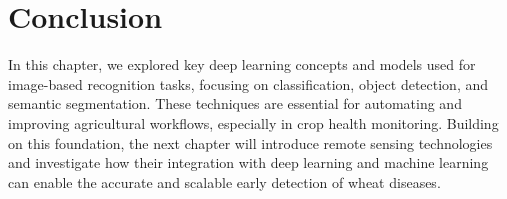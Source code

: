 


\section{Conclusion}
In this chapter, we explored key deep learning concepts and models used for image-based recognition tasks, focusing on classification, object detection, and semantic segmentation. These techniques are essential for automating and improving agricultural workflows, especially in crop health monitoring. Building on this foundation, the next chapter will introduce remote sensing technologies and investigate how their integration with deep learning and machine learning can enable the accurate and scalable early detection of wheat diseases.